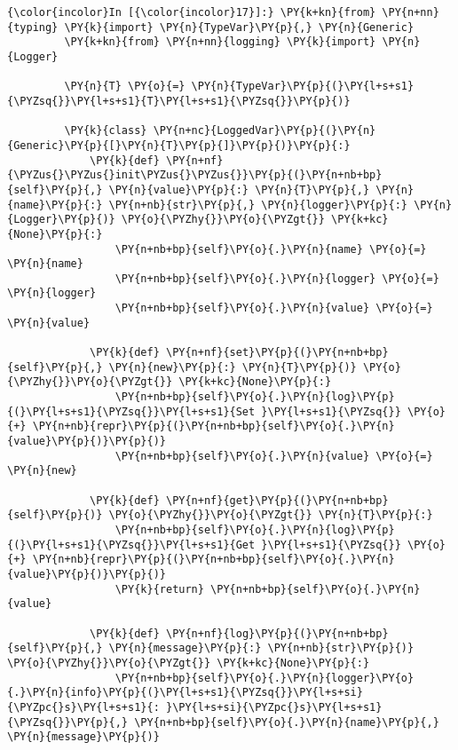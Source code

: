     \begin{Verbatim}[commandchars=\\\{\},frame=single,framerule=0.3mm,rulecolor=\color{cellframecolor}]
{\color{incolor}In [{\color{incolor}17}]:} \PY{k+kn}{from} \PY{n+nn}{typing} \PY{k}{import} \PY{n}{TypeVar}\PY{p}{,} \PY{n}{Generic}
         \PY{k+kn}{from} \PY{n+nn}{logging} \PY{k}{import} \PY{n}{Logger}
         
         \PY{n}{T} \PY{o}{=} \PY{n}{TypeVar}\PY{p}{(}\PY{l+s+s1}{\PYZsq{}}\PY{l+s+s1}{T}\PY{l+s+s1}{\PYZsq{}}\PY{p}{)}
         
         \PY{k}{class} \PY{n+nc}{LoggedVar}\PY{p}{(}\PY{n}{Generic}\PY{p}{[}\PY{n}{T}\PY{p}{]}\PY{p}{)}\PY{p}{:}
             \PY{k}{def} \PY{n+nf}{\PYZus{}\PYZus{}init\PYZus{}\PYZus{}}\PY{p}{(}\PY{n+nb+bp}{self}\PY{p}{,} \PY{n}{value}\PY{p}{:} \PY{n}{T}\PY{p}{,} \PY{n}{name}\PY{p}{:} \PY{n+nb}{str}\PY{p}{,} \PY{n}{logger}\PY{p}{:} \PY{n}{Logger}\PY{p}{)} \PY{o}{\PYZhy{}}\PY{o}{\PYZgt{}} \PY{k+kc}{None}\PY{p}{:}
                 \PY{n+nb+bp}{self}\PY{o}{.}\PY{n}{name} \PY{o}{=} \PY{n}{name}
                 \PY{n+nb+bp}{self}\PY{o}{.}\PY{n}{logger} \PY{o}{=} \PY{n}{logger}
                 \PY{n+nb+bp}{self}\PY{o}{.}\PY{n}{value} \PY{o}{=} \PY{n}{value}
         
             \PY{k}{def} \PY{n+nf}{set}\PY{p}{(}\PY{n+nb+bp}{self}\PY{p}{,} \PY{n}{new}\PY{p}{:} \PY{n}{T}\PY{p}{)} \PY{o}{\PYZhy{}}\PY{o}{\PYZgt{}} \PY{k+kc}{None}\PY{p}{:}
                 \PY{n+nb+bp}{self}\PY{o}{.}\PY{n}{log}\PY{p}{(}\PY{l+s+s1}{\PYZsq{}}\PY{l+s+s1}{Set }\PY{l+s+s1}{\PYZsq{}} \PY{o}{+} \PY{n+nb}{repr}\PY{p}{(}\PY{n+nb+bp}{self}\PY{o}{.}\PY{n}{value}\PY{p}{)}\PY{p}{)}
                 \PY{n+nb+bp}{self}\PY{o}{.}\PY{n}{value} \PY{o}{=} \PY{n}{new}
         
             \PY{k}{def} \PY{n+nf}{get}\PY{p}{(}\PY{n+nb+bp}{self}\PY{p}{)} \PY{o}{\PYZhy{}}\PY{o}{\PYZgt{}} \PY{n}{T}\PY{p}{:}
                 \PY{n+nb+bp}{self}\PY{o}{.}\PY{n}{log}\PY{p}{(}\PY{l+s+s1}{\PYZsq{}}\PY{l+s+s1}{Get }\PY{l+s+s1}{\PYZsq{}} \PY{o}{+} \PY{n+nb}{repr}\PY{p}{(}\PY{n+nb+bp}{self}\PY{o}{.}\PY{n}{value}\PY{p}{)}\PY{p}{)}
                 \PY{k}{return} \PY{n+nb+bp}{self}\PY{o}{.}\PY{n}{value}
         
             \PY{k}{def} \PY{n+nf}{log}\PY{p}{(}\PY{n+nb+bp}{self}\PY{p}{,} \PY{n}{message}\PY{p}{:} \PY{n+nb}{str}\PY{p}{)} \PY{o}{\PYZhy{}}\PY{o}{\PYZgt{}} \PY{k+kc}{None}\PY{p}{:}
                 \PY{n+nb+bp}{self}\PY{o}{.}\PY{n}{logger}\PY{o}{.}\PY{n}{info}\PY{p}{(}\PY{l+s+s1}{\PYZsq{}}\PY{l+s+si}{\PYZpc{}s}\PY{l+s+s1}{: }\PY{l+s+si}{\PYZpc{}s}\PY{l+s+s1}{\PYZsq{}}\PY{p}{,} \PY{n+nb+bp}{self}\PY{o}{.}\PY{n}{name}\PY{p}{,} \PY{n}{message}\PY{p}{)}
\end{Verbatim}


